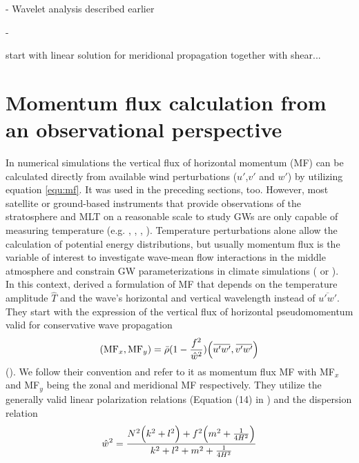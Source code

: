 - Wavelet analysis described earlier

- \cite[]{}




start with linear solution for meridional propagation together with shear...




\section{Momentum flux calculation from an observational perspective}
\label{sec:res3D-sim-vs-obs}
In numerical simulations the vertical flux of horizontal momentum (MF) can be calculated directly from available wind perturbations ($u'$,$v'$ and $w'$) by utilizing equation \ref{equ:mf}. It was used in the preceding sections, too. However, most satellite or ground-based instruments that provide observations of the stratosphere and MLT on a reasonable scale to study GWs are only capable of measuring temperature (e.g. \cite{wu_satellite_1996}, \cite[]{ern_absolute_2004}, \cite{hindley_gravity_2019}, \cite{kaifler_compact_2021}). Temperature perturbations alone allow the calculation of potential energy distributions, but usually momentum flux is the variable of interest to investigate wave-mean flow interactions in the middle atmosphere and constrain GW parameterizations in climate simulations (\cite[]{geller_comparison_2013} or \cite[]{kim_overview_2003}). \\
In this context, \textcite[]{ern_absolute_2004} derived a formulation of MF that depends on the temperature amplitude $\hat{T}$ and the wave's horizontal and vertical wavelength instead of $\overbar{u'w'}$. They start with the expression of the vertical flux of horizontal pseudomomentum valid for conservative wave propagation
\begin{equation}
    (\mathrm{MF}_x, \mathrm{MF}_y) = \bar{\rho} (1-\frac{f^2}{\hat{w}^2}) \Bigl(\overbar{u'w'},\overbar{v'w'}\Bigr) 
    \label{equ:ps-mf}
\end{equation}
(\cite[]{fritts_gravity_2003}). We follow their convention and refer to it as momentum flux MF with MF$_x$ and MF$_y$ being the zonal and meridional MF respectively. They utilize the generally valid linear polarization relations (Equation (14) in \textcite[]{fritts_gravity_2003}) and the dispersion relation
\begin{equation}
    \hat{w}^2 = \frac{N^2 \Bigl(k^2+l^2\Bigr) + f^2 \Bigl(m^2 + \frac{1}{4H^2}\Bigr)}{k^2+l^2+m^2+\frac{1}{4H^2}}
    \label{equ_lid:dispersion_noAss}
\end{equation}
